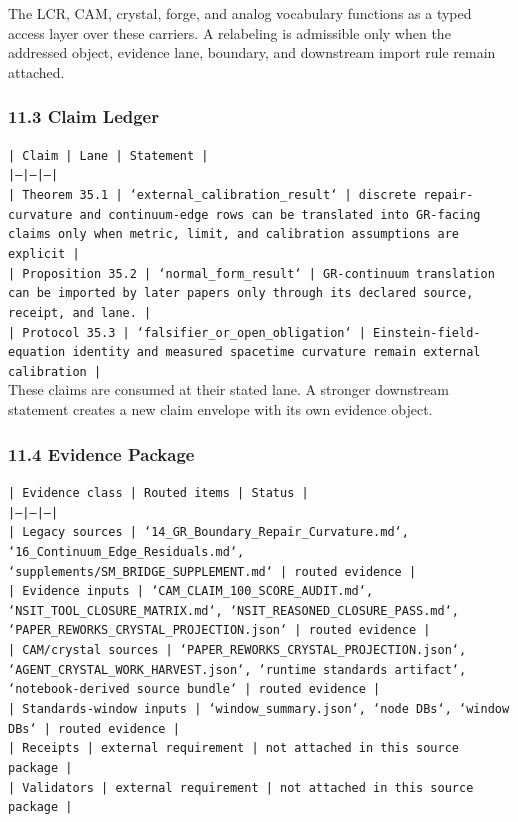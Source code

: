 \documentclass[11pt]{article}
\begin{document}
The LCR, CAM, crystal, forge, and analog vocabulary functions as a typed access
layer over these carriers. A relabeling is admissible only when the addressed
object, evidence lane, boundary, and downstream import rule remain attached.

\subsubsection*{11.3 Claim Ledger}

\noindent\texttt{| Claim | Lane | Statement |}\\
\noindent\texttt{|---|---|---|}\\
\noindent\texttt{| Theorem 35.1 | `external\_calibration\_result` | discrete repair-curvature and continuum-edge rows can be translated into GR-facing claims only when metric, limit, and calibration assumptions are explicit |}\\
\noindent\texttt{| Proposition 35.2 | `normal\_form\_result` | GR-continuum translation can be imported by later papers only through its declared source, receipt, and lane. |}\\
\noindent\texttt{| Protocol 35.3 | `falsifier\_or\_open\_obligation` | Einstein-field-equation identity and measured spacetime curvature remain external calibration |}\\

These claims are consumed at their stated lane. A stronger downstream statement
creates a new claim envelope with its own evidence object.

\subsubsection*{11.4 Evidence Package}

\noindent\texttt{| Evidence class | Routed items | Status |}\\
\noindent\texttt{|---|---|---|}\\
\noindent\texttt{| Legacy sources | `14\_GR\_Boundary\_Repair\_Curvature.md`, `16\_Continuum\_Edge\_Residuals.md`, `supplements/SM\_BRIDGE\_SUPPLEMENT.md` | routed evidence |}\\
\noindent\texttt{| Evidence inputs | `CAM\_CLAIM\_100\_SCORE\_AUDIT.md`, `NSIT\_TOOL\_CLOSURE\_MATRIX.md`, `NSIT\_REASONED\_CLOSURE\_PASS.md`, `PAPER\_REWORKS\_CRYSTAL\_PROJECTION.json` | routed evidence |}\\
\noindent\texttt{| CAM/crystal sources | `PAPER\_REWORKS\_CRYSTAL\_PROJECTION.json`, `AGENT\_CRYSTAL\_WORK\_HARVEST.json`, `runtime standards artifact`, `notebook-derived source bundle` | routed evidence |}\\
\noindent\texttt{| Standards-window inputs | `window\_summary.json`, `node DBs`, `window DBs` | routed evidence |}\\
\noindent\texttt{| Receipts | external requirement | not attached in this source package |}\\
\noindent\texttt{| Validators | external requirement | not attached in this source package |}\\
\end{document}
